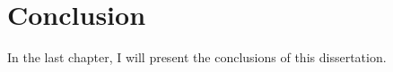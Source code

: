 \chapter{Conclusion}%
\label{chapter:conclusion}

\begin{introduction}
In the last chapter, I will present the conclusions of this dissertation.
\end{introduction} 


 